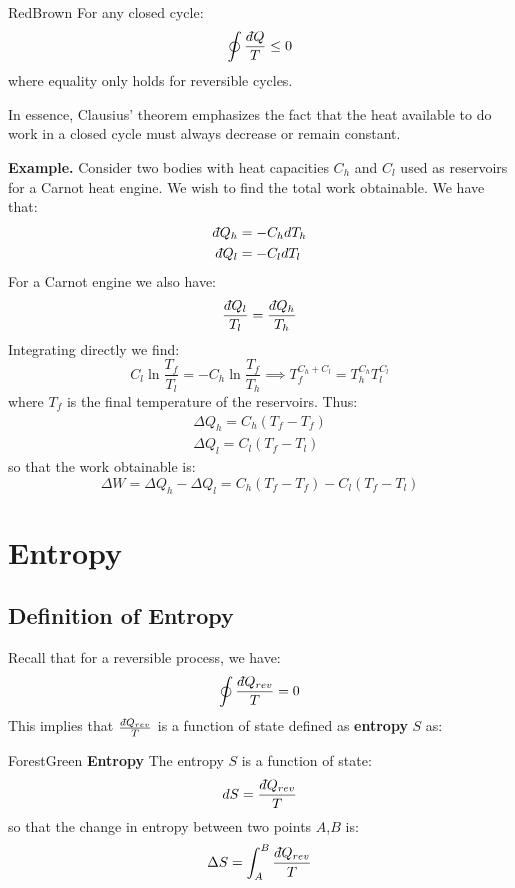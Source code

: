 \documentclass[a4paper,11pt,oneside]{book}
\newcommand{\dbar}{d\hspace*{-0.08em}\bar{}\hspace*{0.1em}}
\begin{document}
\begin{mybox}{RedBrown}{\textbf{}}
For any closed cycle:
\begin{equation}
    \oint \frac{\dbar Q}{T} \leq 0
\end{equation}
where equality only holds for reversible cycles. 
\end{mybox}

In essence, Clausius' theorem emphasizes the fact that the heat available to do work in a closed cycle must always decrease or remain constant. 

\begin{mdframed}
\textbf{Example.} Consider two bodies with heat capacities $C_h$ and $C_l$ used as reservoirs for a Carnot heat engine. We wish to find the total work obtainable. 
We have that:
\begin{align}
    \dbar Q_h &= -C_h dT_h\\
        \dbar Q_l &= -C_l dT_l
\end{align}
For a Carnot engine we also have:
\begin{equation}
    \frac{\dbar Q_l}{T_l}=\frac{\dbar Q_h}{T_h}
\end{equation}
Integrating directly we find:
\begin{equation}
    C_l \ln \frac{T_f}{T_l} = - C_h \ln \frac{T_f}{T_h} \implies T_f^{C_h+C_l}=T_h^{C_h}T_l^{C_l}
\end{equation}
where $T_f$ is the final temperature of the reservoirs. Thus:
\begin{align}
    \Delta Q_h = C_h(T_f-T_f)\\
    \Delta Q_l = C_l(T_f-T_l)
\end{align}
so that the work obtainable is:
\begin{equation}
    \Delta W = \Delta Q_h - \Delta Q_l = C_h(T_f-T_f)-C_l(T_f-T_l)
\end{equation}
\end{mdframed}
\chapter{Entropy}
\section{Definition of Entropy}
Recall that for a reversible process, we have:
\begin{equation}
    \oint \frac{\dbar Q_{rev}}{T}=0 
\end{equation}
This implies that $\frac{\dbar Q_{rev}}{T}$ is a function of state defined as \textbf{entropy} $S$ as:
\begin{mybox}{ForestGreen}{\textbf{ Entropy}}
The entropy $S$ is a function of state:
\begin{equation}
    dS = \frac{\dbar Q_{rev}}{T}
\end{equation}
so that the change in entropy between two points $A$,$B$ is:
\begin{equation}
    \Delta S = \int_A^B \frac{\dbar Q_{rev}}{T}
\end{equation}
\end{mybox}
\end{document}
